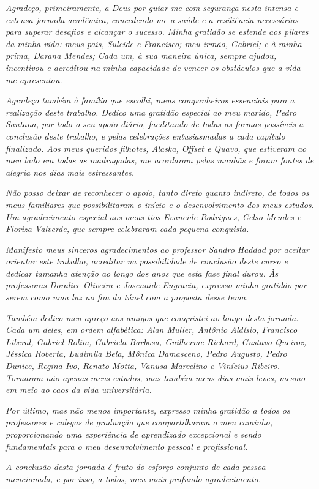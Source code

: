 \begin{agradecimentos}
 
\textit{Agradeço, primeiramente, a Deus por guiar-me com segurança nesta intensa e extensa jornada acadêmica, concedendo-me a saúde e a resiliência necessárias para superar desafios e alcançar o sucesso. Minha gratidão se estende aos pilares da minha vida: meus pais, Suleide e Francisco; meu irmão, Gabriel; e à minha prima, Darana Mendes; Cada um, à sua maneira única, sempre ajudou, incentivou e acreditou na minha capacidade de vencer os obstáculos que a vida me apresentou.}

\textit{Agradeço também à família que escolhi, meus companheiros essenciais para a realização deste trabalho. Dedico uma gratidão especial ao meu marido, Pedro Santana, por todo o seu apoio diário, facilitando de todas as formas possíveis a conclusão deste trabalho, e pelas celebrações entusiasmadas a cada capítulo finalizado. Aos meus queridos filhotes, Alaska, Offset e Quavo, que estiveram ao meu lado em todas as madrugadas, me acordaram pelas manhãs e foram fontes de alegria nos dias mais estressantes.}

\textit{Não posso deixar de reconhecer o apoio, tanto direto quanto indireto, de todos os meus familiares que possibilitaram o início e o desenvolvimento dos meus estudos. Um agradecimento especial aos meus tios Evaneide Rodrigues, Celso Mendes e Floriza Valverde, que sempre celebraram cada pequena conquista.}

\textit{Manifesto meus sinceros agradecimentos ao professor Sandro Haddad por aceitar orientar este trabalho, acreditar na possibilidade de conclusão deste curso e dedicar tamanha atenção ao longo dos anos que esta fase final durou. Às professoras Doralice Oliveira e Josenaide Engracia, expresso minha gratidão por serem como uma luz no fim do túnel com a proposta desse tema.}

\textit{Também dedico meu apreço aos amigos que conquistei ao longo desta jornada. Cada um deles, em ordem alfabética: Alan Muller, Antônio Aldísio, Francisco Liberal, Gabriel Rolim, Gabriela Barbosa, Guilherme Richard, Gustavo Queiroz, Jéssica Roberta, Ludimila Bela, Mônica Damasceno, Pedro Augusto, Pedro Dunice, Regina Ivo, Renato Motta, Vanusa Marcelino e Vinícius Ribeiro. Tornaram não apenas meus estudos, mas também meus dias mais leves, mesmo em meio ao caos da vida universitária.}

\textit{Por último, mas não menos importante, expresso minha gratidão a todos os professores e colegas de graduação que compartilharam o meu caminho, proporcionando uma experiência de aprendizado excepcional e sendo fundamentais para o meu desenvolvimento pessoal e profissional.}

\textit{A conclusão desta jornada é fruto do esforço conjunto de cada pessoa mencionada, e por isso, a todos, meu mais profundo agradecimento.}

\end{agradecimentos}
